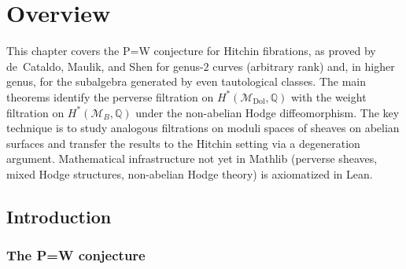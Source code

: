 \chapter{Overview}
\label{chap:overview}


\providecommand{\MDol}{\mathcal{M}_{\mathrm{Dol}}}
\providecommand{\MB}{\mathcal{M}_B}
\providecommand{\QQ}{\mathbb{Q}}
\providecommand{\ZZ}{\mathbb{Z}}
\providecommand{\HodgeTate}[2]{{}^{#1}\!\mathrm{Hdg}^{#2}}
\providecommand{\ch}{\operatorname{ch}}
\providecommand{\supp}{\operatorname{supp}}
\providecommand{\rk}{\operatorname{rank}}

This chapter covers the P=W conjecture for Hitchin fibrations, as proved by
de~Cataldo, Maulik, and Shen for genus-\(2\) curves (arbitrary rank) and, in higher
genus, for the subalgebra generated by even tautological classes.  The main
theorems identify the perverse filtration on \(H^*(\MDol,\QQ)\) with the weight
filtration on \(H^*(\MB,\QQ)\) under the non-abelian Hodge diffeomorphism.  The
key technique is to study analogous filtrations on moduli spaces of sheaves on
abelian surfaces and transfer the results to the Hitchin setting via a
degeneration argument.  Mathematical infrastructure not yet in Mathlib (perverse
sheaves, mixed Hodge structures, non-abelian Hodge theory) is axiomatized in
Lean.


\section{Introduction}

\subsection{The P=W conjecture}


